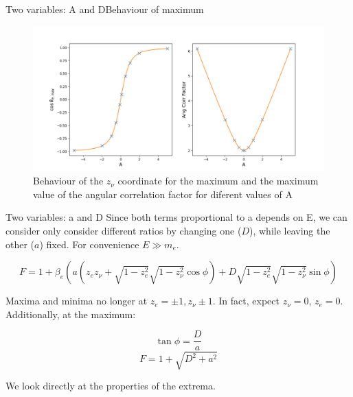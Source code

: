 \documentclass{beamer}
\begin{document}
\begin{frame}{Two variables: A and D}{Behaviour of maximum}
\begin{figure}
	\centering
	\includegraphics[width=0.8\paperwidth]{plots/AD_max_behaviour}
	\caption{Behaviour of the $z_\nu$ coordinate for the maximum and the maximum value of the angular correlation factor for diferent values of A}
\end{figure}
\end{frame}
\begin{frame}{Two variables: a and D}
	Since both terms proportional to a depends on E, we can consider only consider different ratios by changing one ($D$), while leaving the other ($a$) fixed. For convenience $E \gg m_e$.
	
	$$F = 1 + \beta_e(a (z_ez_\nu + \sqrt{1-z^2_e}\sqrt{1-z^2_\nu}\cos \phi) + D\sqrt{1-z^2_e}\sqrt{1-z^2_\nu}\sin \phi)$$
	
	Maxima and minima no longer at $z_e=\pm1,z_\nu \pm1$. In fact, expect $z_\nu = 0$, $z_e = 0$. Additionally, at the maximum:
	
	$$\tan\phi = \frac Da$$
	$$F = 1 + \sqrt{D^2+a^2}$$    
	
	We look directly at the properties of the extrema.
\end{frame}
\end{document}

